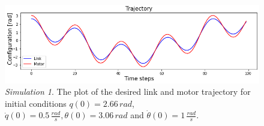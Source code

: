 \documentclass[a4paper]{article}
\begin{document}
\begin{figure}
    \centering
    \includegraphics[scale=0.7]{img/final_results/elastic/300_2/150l_175m/traj_150_175.png}
    \caption{\textit{Simulation 1}. The plot of the desired link and motor trajectory for initial conditions $q(0)=2.66\, rad$, $\dot{q}(0)=0.5\, \frac{rad}{s}, \theta(0)=3.06\, rad$ and $\dot{\theta}(0)=1\, \frac{rad}{s}.$}
    \label{fig:desired_elastic_150_175}
\end{figure}
\end{document}
